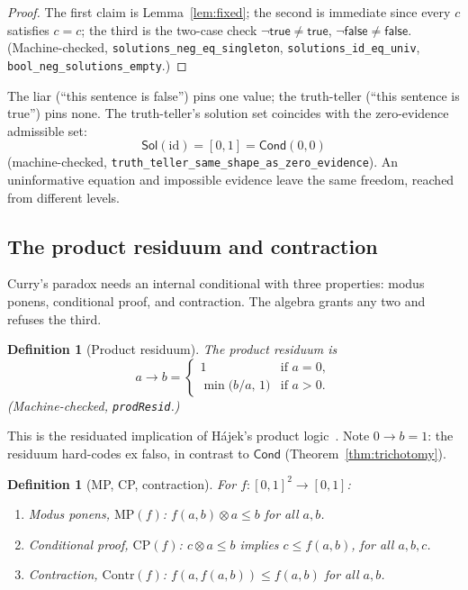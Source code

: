 \documentclass[11pt,a4paper]{article}
\newtheorem{definition}[theorem]{Definition}
\newcommand{\conjc}{\otimes}
\newcommand{\Cond}{\mathsf{Cond}}
\newcommand{\Sol}{\mathsf{Sol}}
\begin{document}
\begin{proof}
The first claim is Lemma~\ref{lem:fixed}; the second is immediate
since every $c$ satisfies $c = c$; the third is the two-case check
$\lnot\mathsf{true} \neq \mathsf{true}$,
$\lnot\mathsf{false} \neq \mathsf{false}$.
(Machine-checked, \texttt{solutions\_neg\_eq\_singleton},
\texttt{solutions\_id\_eq\_univ},
\texttt{bool\_neg\_solutions\_empty}.)
\end{proof}

The liar (``this sentence is false'') pins one value; the
truth-teller (``this sentence is true'') pins none.
The truth-teller's solution set coincides with the zero-evidence
admissible set:
\[
\Sol(\mathrm{id}) = [0,1] = \Cond(0,0)
\]
(machine-checked,
\texttt{truth\_teller\_same\_shape\_as\_zero\_evidence}).
An uninformative equation and impossible evidence leave the same
freedom, reached from different levels.

\subsection{The product residuum and contraction}

Curry's paradox needs an internal conditional with three properties:
modus ponens, conditional proof, and contraction.
The algebra grants any two and refuses the third.

\begin{definition}[Product residuum]
\label{def:resid}
The \emph{product residuum} is
\[
a \to b =
\begin{cases}
1 & \text{if } a = 0,\\
\min\bigl(b/a,\, 1\bigr) & \text{if } a > 0.
\end{cases}
\]
(Machine-checked, \texttt{prodResid}.)
\end{definition}

This is the residuated implication of H\'ajek's product
logic~\cite{hajek1998}.
Note $0 \to b = 1$: the residuum hard-codes ex falso, in contrast to
$\Cond$ (Theorem~\ref{thm:trichotomy}).

\begin{definition}[MP, CP, contraction]
\label{def:mp-cp}
For $f : [0,1]^2 \to [0,1]$:
\begin{enumerate}[label=(\roman*),nosep]
\item \emph{Modus ponens}, $\mathrm{MP}(f)$:\quad
  $f(a,b) \conjc a \leq b$ for all $a, b$.
\item \emph{Conditional proof}, $\mathrm{CP}(f)$:\quad
  $c \conjc a \leq b$ implies $c \leq f(a,b)$, for all $a, b, c$.
\item \emph{Contraction}, $\mathrm{Contr}(f)$:\quad
  $f(a, f(a,b)) \leq f(a,b)$ for all $a, b$.
\end{enumerate}
\end{definition}
\end{document}
